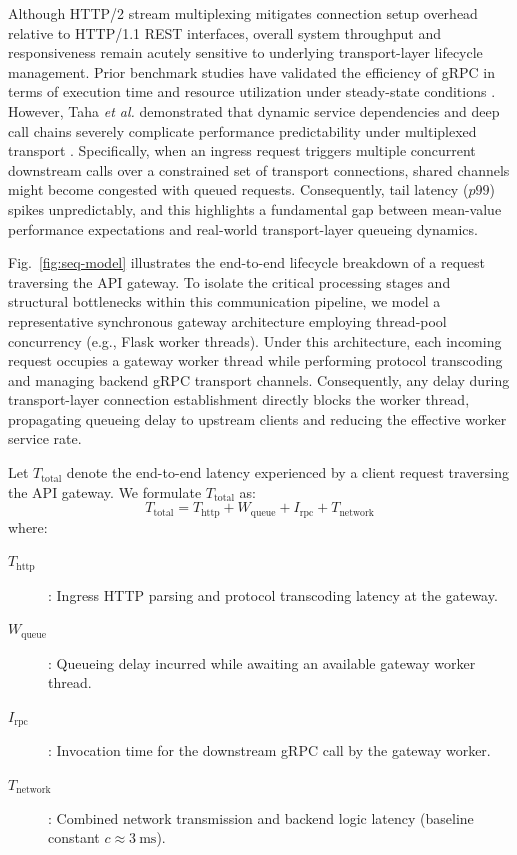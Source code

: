 \documentclass{ieeeaccess}
\begin{document}
	
	Although HTTP/2 stream multiplexing mitigates connection setup overhead relative to HTTP/1.1 REST interfaces, overall system throughput and responsiveness remain acutely sensitive to underlying transport-layer lifecycle management. Prior benchmark studies have validated the efficiency of gRPC in terms of execution time and resource utilization under steady-state conditions \cite{alzahrani2026scalable}. However, Taha \emph{et al.} demonstrated that dynamic service dependencies and deep call chains severely complicate performance predictability under multiplexed transport \cite{taha2024proactive}. Specifically, when an ingress request triggers multiple concurrent downstream calls over a constrained set of transport connections, shared channels might become congested with queued requests. Consequently, tail latency ($p99$) spikes unpredictably, and this highlights a fundamental gap between mean-value performance expectations and real-world transport-layer queueing dynamics.
	
	Fig.~\ref{fig:seq-model} illustrates the end-to-end lifecycle breakdown of a request traversing the API gateway. To isolate the critical processing stages and structural bottlenecks within this communication pipeline, we model a representative synchronous gateway architecture \cite{gunicorn} employing thread-pool concurrency (e.g., Flask worker threads). Under this architecture, each incoming request occupies a gateway worker thread while performing protocol transcoding and managing backend gRPC transport channels. Consequently, any delay during transport-layer connection establishment directly blocks the worker thread, propagating queueing delay to upstream clients and reducing the effective worker service rate.
	
	Let $T_{\text{total}}$ denote the end-to-end latency experienced by a client request traversing the API gateway. We formulate $T_{\text{total}}$ as:
	\begin{equation}
		T_{\text{total}} = T_{\text{http}} + W_{\text{queue}} + I_{\text{rpc}} + T_{\text{network}}
	\end{equation}
	where:
	\begin{description}
		\item[$T_{\text{http}}$] : Ingress HTTP parsing and protocol transcoding latency at the gateway.
		\item[$W_{\text{queue}}$] : Queueing delay incurred while awaiting an available gateway worker thread.
		\item[$I_{\text{rpc}}$] : Invocation time for the downstream gRPC call by the gateway worker.
		\item[$T_{\text{network}}$] : Combined network transmission and backend logic latency (baseline constant $c \approx 3\ \text{ms}$).
	\end{description}
	
\end{document}
